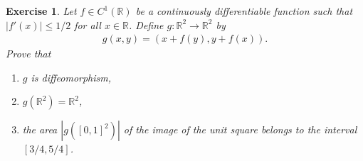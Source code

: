 \documentclass[11pt]{article}
\newtheorem{exercise}{Exercise}[section]
\theoremstyle{definition}
\numberwithin{equation}{subsection}
\begin{document}
\medskip

\begin{exercise}{\rm *}\label{August_2015_6}
Let $f \in C^1(\mathbb{R})$ be a continuously differentiable function such that $\left|f'(x)\right| \leq 1/2$ for all $x \in \mathbb{R}$. Define $g: \mathbb{R}^2 \to \mathbb{R}^2$ by
\begin{align*}
    g(x, y) = (x + f(y), y + f(x)).
\end{align*}
Prove that
\begin{enumerate}[label=(\alph*)]
    \item $g$ is diffeomorphism,
    
    \item $g(\mathbb{R}^2) = \mathbb{R}^2$,
    
    \item the area $\left| g([0,1]^2) \right|$ of the image of the unit square belongs to the interval $[3/4, 5/4]$.
\end{enumerate}
\end{exercise}
\end{document}
